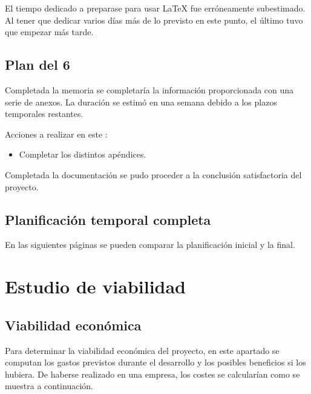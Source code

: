 
El tiempo dedicado a preparase para usar \LaTeX{} fue erróneamente subestimado.
Al tener que dedicar varios días más de lo previsto en este punto, el último
 tuvo que empezar más tarde.

\clearpage

\subsection{Plan del  6} \label{sec:plan-s6}
Completada la memoria se completaría la información proporcionada con una
serie de anexos. La duración se estimó en una semana debido a los plazos
temporales restantes.

Acciones a realizar en este :
\begin{itemize}
  \item Completar los distintos apéndices.
\end{itemize}


Completada la documentación se pudo proceder a la conclusión satisfactoria
del proyecto.

\clearpage

\subsection{Planificación temporal completa} \label{sec:plan-total}
En las siguientes páginas se pueden comparar la planificación inicial
y la final.





\clearpage



\section{Estudio de viabilidad}


\subsection{Viabilidad económica}
Para determinar la viabilidad económica del proyecto, en este apartado se
computan los gastos previstos durante el desarrollo y los posibles beneficios
si los hubiera. De haberse realizado en una empresa, los costes se calcularían
como se muestra a continuación.

